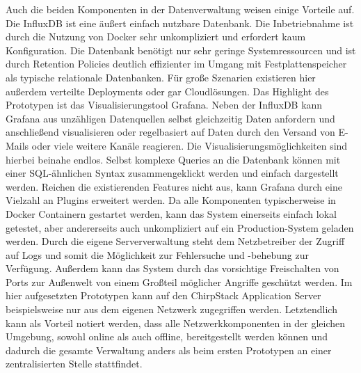 Auch die beiden Komponenten in der Datenverwaltung weisen einige Vorteile auf. Die InfluxDB ist eine äußert einfach nutzbare Datenbank. Die Inbetriebnahme ist durch die Nutzung von Docker sehr unkompliziert und erfordert kaum Konfiguration. Die Datenbank benötigt nur sehr geringe Systemressourcen und ist durch Retention Policies deutlich effizienter im Umgang mit Festplattenspeicher als typische relationale Datenbanken. Für große Szenarien existieren hier außerdem verteilte Deployments oder gar Cloudlösungen. Das Highlight des Prototypen ist das Visualisierungstool Grafana. Neben der InfluxDB kann Grafana aus unzähligen Datenquellen selbst gleichzeitig Daten anfordern und anschließend visualisieren oder regelbasiert auf Daten durch den Versand von E-Mails oder viele weitere Kanäle reagieren. Die Visualisierungsmöglichkeiten sind hierbei beinahe endlos. Selbst komplexe Queries an die Datenbank können mit einer SQL-ähnlichen Syntax zusammengeklickt werden und einfach dargestellt werden. Reichen die existierenden Features nicht aus, kann Grafana durch eine Vielzahl an Plugins erweitert werden. Da alle Komponenten typischerweise in Docker Containern gestartet werden, kann das System einerseits einfach lokal getestet, aber andererseits auch unkompliziert auf ein Production-System geladen werden. Durch die eigene Serververwaltung steht dem Netzbetreiber der Zugriff auf Logs und somit die Möglichkeit zur Fehlersuche und -behebung zur Verfügung. Außerdem kann das System durch das vorsichtige Freischalten von Ports zur Außenwelt von einem Großteil möglicher Angriffe geschützt werden. Im hier aufgesetzten Prototypen kann auf den ChirpStack Application Server beispielsweise nur aus dem eigenen Netzwerk zugegriffen werden. Letztendlich kann als Vorteil notiert werden, dass alle Netzwerkkomponenten in der gleichen Umgebung, sowohl online als auch offline, bereitgestellt werden können und dadurch die gesamte Verwaltung anders als beim ersten Prototypen an einer zentralisierten Stelle stattfindet.

